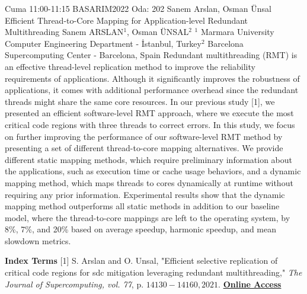 
    \begin{abstract_basarim}
    {Cuma 11:00-11:15}
    {BASARIM2022}
    {Oda: 202}
    {Sanem Arslan, Osman Ünsal}
    {Efficient Thread-to-Core Mapping for Application-level Redundant Multithreading}
    {%
    Sanem ARSLAN$^{1}$, Osman ÜNSAL$^{2}$}
    {%
    }
    {%
    $^1$ Marmara University Computer Engineering Department - İstanbul, Turkey\newline{}$^2$ Barcelona Supercomputing Center - Barcelona, Spain}
    Redundant multithreading (RMT) is an effective thread-level replication method to improve the reliability requirements of applications. Although it significantly improves the robustness of applications, it comes with additional performance overhead since the redundant threads might share the same core resources. In our previous study [1], we presented an efficient software-level RMT approach, where we execute the most critical code regions with three threads to correct errors. In this study, we focus on further improving the performance of our software-level RMT method by presenting a set of different thread-to-core mapping alternatives. We provide different static mapping methods, which require preliminary information about the applications, such as execution time or cache usage behaviors, and a dynamic mapping method, which maps threads to cores dynamically at runtime without requiring any prior information. Experimental results show that the dynamic mapping method outperforms all static methods in addition to our baseline model, where the thread-to-core mappings are left to the operating system, by 8\%, 7\%, and 20\% based on average speedup, harmonic speedup, and mean slowdown metrics. 
    
            \textbf{Index Terms} \newline{}[1] S. Arslan and O. Unsal, "Efficient selective replication of critical code regions for sdc mitigation leveraging redundant multithreading," \textit{The Journal of Supercomputing, vol. 77}, p. $14130-14160,2021$.
     \newline\newline\noindent \href{https://drive.google.com/file/d/1L2YXk26Ol0Ns1RC6ZMFP_ZEIi01lXOz9/view?usp=drivesdk}{\bfseries Online Access}
    \end{abstract_basarim}
    
